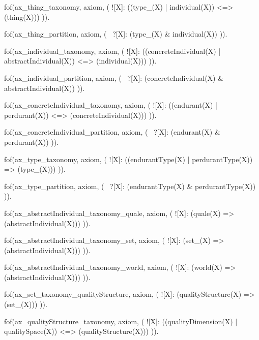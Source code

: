 


fof(ax_thing_taxonomy, axiom, (
  ![X]: ((type_(X) | individual(X)) <=> (thing(X)))
)).

fof(ax_thing_partition, axiom, (
  ~?[X]: (type_(X) & individual(X))
)).


fof(ax_individual_taxonomy, axiom, (
  ![X]: ((concreteIndividual(X) | abstractIndividual(X)) <=> (individual(X)))
)).

fof(ax_individual_partition, axiom, (
  ~?[X]: (concreteIndividual(X) & abstractIndividual(X))
)).


fof(ax_concreteIndividual_taxonomy, axiom, (
  ![X]: ((endurant(X) | perdurant(X)) <=> (concreteIndividual(X)))
)).

fof(ax_concreteIndividual_partition, axiom, (
  ~?[X]: (endurant(X) & perdurant(X))
)).


fof(ax_type_taxonomy, axiom, (
  ![X]: ((endurantType(X) | perdurantType(X)) => (type_(X)))
)).

fof(ax_type_partition, axiom, (
  ~?[X]: (endurantType(X) & perdurantType(X))
)).




fof(ax_abstractIndividual_taxonomy_quale, axiom, (
  ![X]: (quale(X) => (abstractIndividual(X)))
)).

fof(ax_abstractIndividual_taxonomy_set, axiom, (
  ![X]: (set_(X) => (abstractIndividual(X)))
)).

fof(ax_abstractIndividual_taxonomy_world, axiom, (
  ![X]: (world(X) => (abstractIndividual(X)))
)).


fof(ax_set_taxonomy_qualityStructure, axiom, (
  ![X]: (qualityStructure(X) => (set_(X)))
)).


fof(ax_qualityStructure_taxonomy, axiom, (
  ![X]: ((qualityDimension(X) | qualitySpace(X)) <=> (qualityStructure(X)))
)).

